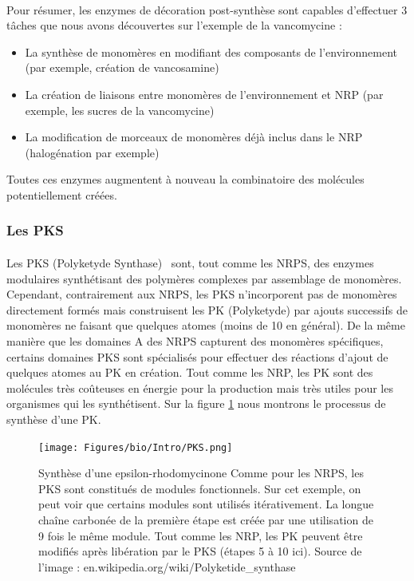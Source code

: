 \documentclass[12pt,french,twoside]{report}
\begin{document}
\paragraph{}Pour résumer, les enzymes de décoration post-synthèse sont capables d'effectuer 3 tâches que nous avons découvertes sur l'exemple de la vancomycine :
\begin{itemize}
  \item La synthèse de monomères en modifiant des composants de l'environnement (par exemple, création de vancosamine)
  \item La création de liaisons entre monomères de l'environnement et NRP (par exemple, les sucres de la vancomycine)
  \item La modification de morceaux de monomères déjà inclus dans le NRP (halogénation par exemple)
\end{itemize}

Toutes ces enzymes augmentent à nouveau la combinatoire des molécules potentiellement créées.



\subsubsection{Les PKS}

\paragraph{}Les PKS (Polyketyde Synthase)~\cite{shen_polyketide_2003,staunton_polyketide_2001} sont, tout comme les NRPS, des enzymes modulaires synthétisant des polymères complexes par assemblage de monomères.
Cependant, contrairement aux NRPS, les PKS n'incorporent pas de monomères directement formés mais construisent les PK (Polyketyde) par ajouts successifs de monomères ne faisant que quelques atomes (moins de 10 en général).
De la même manière que les domaines A des NRPS capturent des monomères spécifiques, certains domaines PKS sont spécialisés pour effectuer des réactions d'ajout de quelques atomes au PK en création.
Tout comme les NRP, les PK sont des molécules très coûteuses en énergie pour la production mais très utiles pour les organismes qui les synthétisent.
Sur la figure \ref{pks} nous montrons le processus de synthèse d'une PK.

\begin{figure}
  \begin{center}
    \texttt{[image: Figures/bio/Intro/PKS.png]}
    \caption{\label{pks}Synthèse d'une epsilon-rhodomycinone
    Comme pour les NRPS, les PKS sont constitués de modules fonctionnels.
    Sur cet exemple, on peut voir que certains modules sont utilisés itérativement.
    La longue chaîne carbonée de la première étape est créée par une utilisation de 9 fois le même module.
    Tout comme les NRP, les PK peuvent être modifiés après libération par le PKS (étapes 5 à 10 ici).
    Source de l'image : en.wikipedia.org/wiki/Polyketide\_synthase}
  \end{center}
\end{figure}
\end{document}
